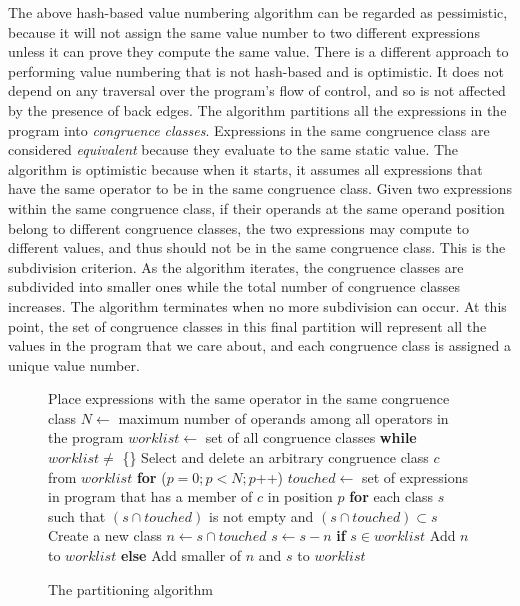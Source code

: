 The above hash-based value numbering algorithm can be regarded as pessimistic, because it will not assign the same value number to two different expressions unless it can prove they compute the same value. 
There is a different approach to performing value numbering that is not hash-based and is optimistic. 
It does not depend on any traversal over the program's flow of control, and so is not affected by the presence of back edges. 
The algorithm partitions all the expressions in the program into \emph{congruence classes}. 
Expressions in the same congruence class are considered \emph{equivalent} because they evaluate to the same static value. 
The algorithm is optimistic because when it starts, it assumes all expressions that have the same operator to be in the same congruence class. 
Given two expressions within the same congruence class, if their operands at the same operand position belong to different congruence classes, the two expressions may compute to different values, and thus should not be in the same congruence class. 
This is the subdivision criterion. 
As the algorithm iterates, the congruence classes are subdivided into smaller ones while the total number of congruence classes increases. 
The algorithm terminates when no more subdivision can occur. 
At this point, the set of congruence classes in this final partition will represent all the values in the program that we care about, and each congruence class is assigned a unique value number.

\begin{figure}[t]
\setcounter{linectr}{0}
\centering
\begin{minipage}[t]{6in}
\begin{code}
 Place expressions with the same operator in the same congruence class
 $N \leftarrow$ maximum number of operands among all operators in the program
 $worklist \leftarrow$ set of all congruence classes
 {\bf while} $worklist \neq$ \{\} 
    Select and delete an arbitrary congruence class $c$ from $worklist$
    {\bf for} ($p = 0; p < N; p$++)
      $touched \leftarrow$ set of expressions in program that has a member of $c$ in position $p$
      {\bf for} each class $s$ such that $(s \cap touched)$ is not empty and $(s \cap touched) \subset s$
        Create a new class $n \leftarrow s \cap touched$
        $s \leftarrow s - n$
        {\bf if} $s \in worklist$
           Add $n$ to $worklist$
        {\bf else}
           Add smaller of $n$ and $s$ to $worklist$
\end{code}
\end{minipage}
\caption{The partitioning algorithm}
\label{fig:partition-alg}
\end{figure}

